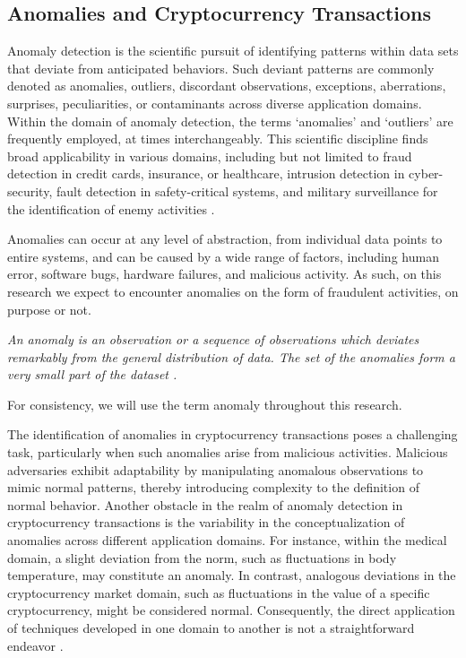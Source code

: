 \subsection{Anomalies and Cryptocurrency Transactions}
Anomaly detection is the scientific pursuit of identifying patterns within data sets that deviate from anticipated
behaviors. Such deviant patterns are commonly denoted as anomalies, outliers, discordant observations, exceptions,
aberrations, surprises, peculiarities, or contaminants across diverse application domains. Within the domain of anomaly
detection, the terms `anomalies' and `outliers' are frequently employed, at times interchangeably. This scientific
discipline finds broad applicability in various domains, including but not limited to fraud detection in credit cards,
insurance, or healthcare, intrusion detection in cyber-security, fault detection in safety-critical systems, and
military surveillance for the identification of enemy activities \cite{10.1145/1541880.1541882}.

Anomalies can occur at any level of abstraction, from individual data points to entire systems, and can be caused by a
wide range of factors, including human error, software bugs, hardware failures, and malicious activity. As such, on this
research we expect to encounter anomalies on the form of fraudulent activities, on purpose or not.

\begin{definition}
    \textit{An anomaly is an observation or a sequence of observations which deviates remarkably from the general distribution of data. The set of the anomalies form a very small part of the dataset \cite{hawkins1980identification}.}
\end{definition}

For consistency, we will use the term anomaly throughout this research.

The identification of anomalies in cryptocurrency transactions poses a challenging task, particularly when such
anomalies arise from malicious activities. Malicious adversaries exhibit adaptability by manipulating anomalous
observations to mimic normal patterns, thereby introducing complexity to the definition of normal behavior. Another
obstacle in the realm of anomaly detection in cryptocurrency transactions is the variability in the conceptualization of
anomalies across different application domains. For instance, within the medical domain, a slight deviation from the
norm, such as fluctuations in body temperature, may constitute an anomaly. In contrast, analogous deviations in the
cryptocurrency market domain, such as fluctuations in the value of a specific cryptocurrency, might be considered
normal. Consequently, the direct application of techniques developed in one domain to another is not a straightforward
endeavor \cite{10.1145/1541880.1541882}.
